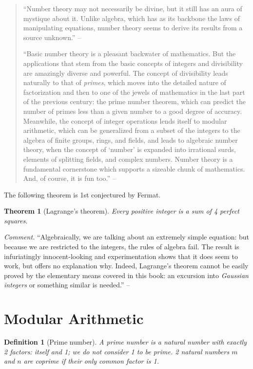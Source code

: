 \documentclass[oneside]{book}
\numberwithin{equation}{section}
\newtheorem{definition}{Definition}[section]
\newtheorem{theorem}{Theorem}[section]
\begin{document}
\begin{quotation}
	``Number theory may not necessarily be divine, but it still has an aura of mystique about it. Unlike algebra, which has as its backbone the laws of manipulating equations, number theory seems to derive its results from a source unknown.'' -- \cite[Chap. 2, p. 9]{Tao2006}
	
	``Basic number theory is a pleasant backwater of mathematics. But the applications that stem from the basic concepts of integers and divisibility are amazingly diverse and powerful. The concept of divisibility leads naturally to that of \textit{primes}, which moves into the detailed nature of factorization and then to one of the jewels of mathematics in the last part of the previous century: the prime number theorem, which can predict the number of primes less than a given number to a good degree of accuracy. Meanwhile, the concept of integer operations lends itself to modular arithmetic, which can be generalized from a subset of the integers to the algebra of finite groups, rings, and fields, and leads to algebraic number theory, when the concept of `number' is expanded into irrational surds, elements of splitting 	fields, and complex numbers. Number theory is a fundamental cornerstone which supports a sizeable chunk of mathematics. And, of course, it is fun too.'' -- \cite[Chap. 2, p. 10]{Tao2006}
\end{quotation}
The following theorem is 1st conjectured by Fermat.

\begin{theorem}[Lagrange's theorem]
	Every positive integer is a sum of 4 perfect squares.
\end{theorem}
\textit{Comment.} ``Algebraically, we are talking about an extremely simple equation: but because we are restricted to the integers, the rules of algebra fail. The result is infuriatingly innocent-looking and experimentation shows that it does seem to work, but offers no explanation why. Indeed, Lagrange's theorem cannot be easily proved by the elementary means covered in this book: an excursion into \textit{Gaussian integers} or something similar is needed.'' -- \cite[Chap. 2, p. 9]{Tao2006}

\section{Modular Arithmetic}
\begin{definition}[Prime number]
	A \emph{prime number} is a natural number with exactly 2 factors: itself and 1; we do not consider 1 to be prime. 2 natural numbers $m$ and $n$ are \emph{coprime} if their only common factor is 1.
\end{definition}
\end{document}
